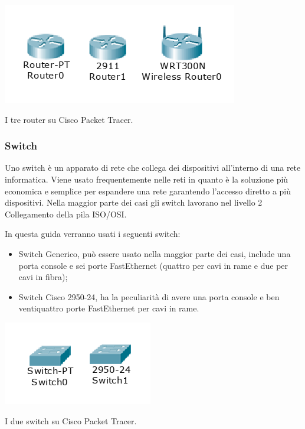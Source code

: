 \begin{sfigure}
    \centering
    \captionsetup{type=figure}
    \includegraphics[scale=.5]{images/02.packet-tracer/router.png}
    \caption{I tre router su Cisco Packet Tracer.}
\end{sfigure}

\subsubsection{Switch}
Uno switch è un apparato di rete che collega dei dispositivi all'interno di una rete informatica. Viene usato frequentemente nelle reti in quanto è la soluzione più economica e semplice per espandere una rete garantendo l'accesso diretto a più dispositivi. Nella maggior parte dei casi gli switch lavorano nel livello 2 Collegamento della pila ISO/OSI.

\smallskip

\noindent In questa guida verranno usati i seguenti switch:

\begin{itemize}
    \item Switch Generico, può essere usato nella maggior parte dei casi, include una porta console e sei porte FastEthernet (quattro per cavi in rame e due per cavi in fibra);
    \item Switch Cisco 2950-24, ha la peculiarità di avere una porta console e ben ventiquattro porte FastEthernet per cavi in rame.
\end{itemize}

\begin{sfigure}
    \centering
    \captionsetup{type=figure}
    \includegraphics[scale=.5]{images/02.packet-tracer/switch.png}
    \caption{I due switch su Cisco Packet Tracer.}
\end{sfigure}

